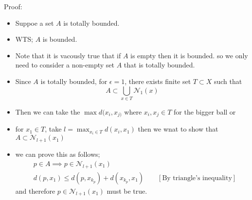 \documentclass[12pt,a4paper]{article}
\begin{document}
Proof:
\begin{itemize}
    \item Suppoe a set \(A\)  is totally bounded.
    \item WTS; \(A\) is bounded.
    \item Note that it is vacously true that if \(A\) is empty then it is bounded. so we only need to consider a non-empty set \(A\) that is totally bounded.
    \item Since \(A\) is totally bounded, for \(\epsilon=1\), there exists finite set \(T \subset X\) such that \[A \subset \bigcup_{x\in T}\mathcal{N}_{1}(x)\] 
    \item Then we can take the \(\max d(x_{i},x_{j)}\) where \(x_{i},x_{j} \in T\) for the bigger ball or
    \item for \(x_{1} \in T\), take \(l=\max_{x_{i}\in T} d(x_{i}, x_{1})\) then we wnat to show that \(A \subset \mathcal{N}_{l+1}(x_{1})\) 
    \item we can prove this as follows;
    \begin{align*}
        &p \in A \implies p \in \mathcal{N}_{l+1}(x_{1})\\
        &d(p,x_{1}) \leq d(p,x_{k_{p}}) + d (x_{k_{p}}, x_{1}) \qquad [\text{By triangle's inequality}]
    \end{align*}
     and therefore \( p \in \mathcal{N}_{l+1}(x_{1})\) must be true.  
\end{itemize}
\end{document}
